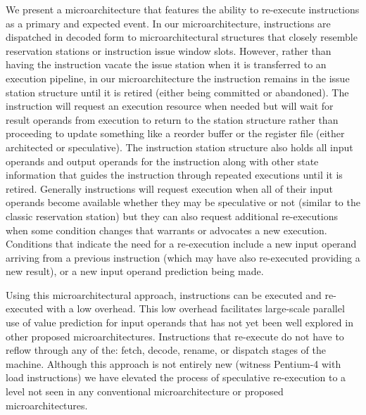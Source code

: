 \documentclass[10pt,twocolumn,dvips]{article}
\begin{document}
We present a microarchitecture that features the ability to
re-execute 
instructions as a primary and expected event.
In our microarchitecture, instructions are dispatched in decoded form
to microarchitectural structures that closely resemble
reservation stations or instruction issue window slots.
However, rather than having the instruction vacate the issue station
when it is transferred to an execution pipeline,
in our microarchitecture the instruction remains in the issue station
structure until it is retired (either being committed or abandoned).
The instruction will request an execution resource when needed
but will wait for result operands from execution to return to 
the station structure rather than proceeding to update something
like a reorder buffer or the register file (either architected or
speculative).
The instruction station structure also holds all input operands
and output operands for the instruction along with other state
information that guides the instruction through repeated
executions until it is retired.
Generally instructions will request execution when all of their
input operands become available whether they may be speculative or not
(similar to the classic reservation station)
but they can also request additional re-executions when some
condition changes that warrants or advocates a new execution.
Conditions that indicate the need for a re-execution include
a new input operand arriving from a previous instruction (which
may have also re-executed providing a new result), 
or a new input operand prediction
being made.

Using this microarchitectural approach, instructions can be 
executed and
re-executed with a low overhead.  This low overhead facilitates
large-scale parallel use of value prediction for input operands
that has not yet been well explored in other proposed microarchitectures.
Instructions that re-execute
do not have to reflow through any of the: fetch, decode, rename, or dispatch
stages of the machine.  Although this approach is not entirely 
new (witness Pentium-4 with
load instructions) we have elevated the process of speculative re-execution to
a level not seen in any conventional microarchitecture or proposed
microarchitectures.
\end{document}
